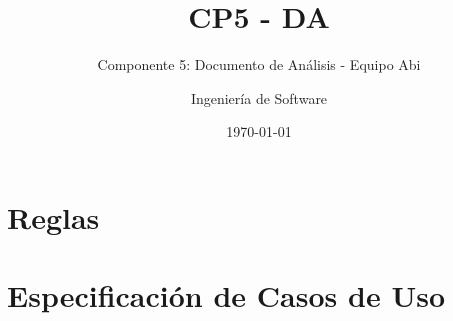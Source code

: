 \documentclass[10pt]{book}
\title{CP5 - DA}
\subtitle{Componente 5: Documento de Análisis - Equipo Abi}
\author{Ingeniería de Software}
\date{\today}
\begin{document}
\maketitle
\thispagestyle{empty}
\tableofcontents

%
%
\chapter{Reglas}

\chapter{Especificación de Casos de Uso}

%



%

\end{document}
